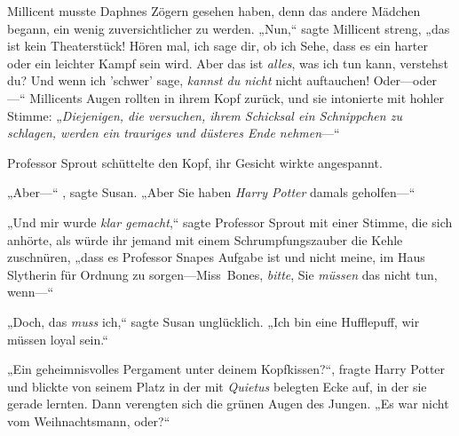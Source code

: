 Millicent musste Daphnes Zögern gesehen haben, denn das andere Mädchen begann, ein wenig zuversichtlicher zu werden. „Nun,“ sagte Millicent streng, „das ist kein Theaterstück! Hören mal, ich sage dir, ob ich Sehe, dass es ein harter oder ein leichter Kampf sein wird. Aber das ist \emph{alles}, was ich tun kann, verstehst du? Und wenn ich 'schwer' sage, \emph{kannst du nicht} nicht auftauchen! Oder—oder—“ Millicents Augen rollten in ihrem Kopf zurück, und sie intonierte mit hohler Stimme: „\emph{Diejenigen, die versuchen, ihrem Schicksal ein Schnippchen zu schlagen, werden ein trauriges und düsteres Ende nehmen}—“

\later

Professor Sprout schüttelte den Kopf, ihr Gesicht wirkte angespannt.

„Aber—“ , sagte Susan. „Aber Sie haben \emph{Harry Potter} damals geholfen—“

„Und mir wurde \emph{klar gemacht},“ sagte Professor Sprout mit einer Stimme, die sich anhörte, als würde ihr jemand mit einem Schrumpfungszauber die Kehle zuschnüren, „dass es Professor Snapes Aufgabe ist und nicht meine, im Haus Slytherin für Ordnung zu sorgen—Miss~Bones, \emph{bitte}, Sie \emph{müssen} das nicht tun, wenn—“

„Doch, das \emph{muss} ich,“ sagte Susan unglücklich. „Ich bin eine Hufflepuff, wir müssen loyal sein.“

\later

„Ein geheimnisvolles Pergament unter deinem Kopfkissen?“, fragte Harry Potter und blickte von seinem Platz in der mit \emph{Quietus} belegten Ecke auf, in der sie gerade lernten. Dann verengten sich die grünen Augen des Jungen. „Es war nicht vom Weihnachtsmann, oder?“

